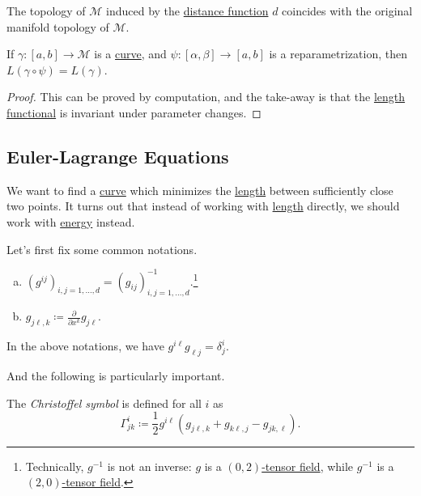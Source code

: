 \begin{corollary}
	The topology of \(\mathcal{M} \) induced by the \hyperref[def:distance]{distance function} \(d\) coincides with the original manifold topology of \(\mathcal{M} \).
\end{corollary}

\begin{lemma}
	If \(\gamma\colon [a, b] \to \mathcal{M} \) is a \hyperref[def:curve]{curve}, and \(\psi \colon [\alpha , \beta ] \to [a, b]\) is a reparametrization, then \(L(\gamma \circ \psi ) = L(\gamma )\).
\end{lemma}
\begin{proof}
	This can be proved by computation, and the take-away is that the \hyperref[def:length]{length functional} is invariant under parameter changes.
\end{proof}

\subsection{Euler-Lagrange Equations}
We want to find a \hyperref[def:curve]{curve} which minimizes the \hyperref[def:length]{length} between sufficiently close two points. It turns out that instead of working with \hyperref[def:length]{length} directly, we should work with \hyperref[def:energy]{energy} instead.

\begin{notation}
	Let's first fix some common notations.

	\begin{enumerate}[(a)]
		\item \(\left( g^{ij} \right) _{i, j=1, \dots , d} = \left( g_{ij} \right)_{i, j = 1, \dots , d} ^{-1} \).\footnote{Technically, \(g^{-1} \) is not an inverse: \(g\) is a \hyperref[def:tensor-field]{\((0, 2)\)-tensor field}, while \(g^{-1} \) is a \hyperref[def:tensor-field]{\((2, 0)\)-tensor field}.}
		\item \(g_{j \ell , k} \coloneqq \frac{\partial }{\partial x^k} g_{j \ell }\).
	\end{enumerate}
\end{notation}

\begin{note}
	In the above notations, we have \(g^{i \ell} g_{\ell j}=\delta ^i_j \).
\end{note}

And the following is particularly important.

\begin{notation}\label{not:Christoffel-symbol}
	The \emph{Christoffel symbol} is defined for all \(i\) as
	\[
		\Gamma ^i_{jk} \coloneqq \frac{1}{2}g^{i \ell }\left( g_{j \ell , k} + g_{k \ell , j} - g_{jk, \ell }\right).
	\]
\end{notation}

